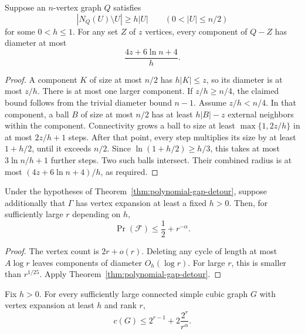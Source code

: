 \begin{lemma}
\label{lem:expander-deletion-diameter}
Suppose an $n$-vertex graph $Q$ satisfies
\[
 |N_Q(U)\setminus U|\ge h|U|
 \qquad(0<|U|\le n/2)
\]
for some $0<h\le1$.
For any set $Z$ of $z$ vertices, every component of $Q-Z$ has diameter at most
\[
 \frac{4z+6\ln n+4}{h}.
\]
\end{lemma}

\begin{proof}
A component $K$ of size at most $n/2$ has $h|K|\le z$, so its diameter is at most $z/h$.
There is at most one larger component.
If $z/h\ge n/4$, the claimed bound follows from the trivial diameter bound $n-1$.
Assume $z/h<n/4$.
In that component, a ball $B$ of size at most $n/2$ has at least $h|B|-z$ external neighbors within the component.
Connectivity grows a ball to size at least $\max\{1,2z/h\}$ in at most $2z/h+1$ steps.
After that point, every step multiplies its size by at least $1+h/2$, until it exceeds $n/2$.
Since $\ln(1+h/2)\ge h/3$, this takes at most $3\ln n/h+1$ further steps.
Two such balls intersect.
Their combined radius is at most $(4z+6\ln n+4)/h$, as required.
\end{proof}

\begin{corollary}
\label{cor:expander-polynomial-forest}
Under the hypotheses of Theorem~\ref{thm:polynomial-gap-detour}, suppose additionally that $\Gamma$ has vertex expansion at least a fixed $h>0$.
Then, for sufficiently large $r$ depending on $h$,
\[
 \Pr(\mathcal F)\le\frac12+r^{-\alpha}.
\]
\end{corollary}

\begin{proof}
The vertex count is $2r+o(r)$.
Deleting any cycle of length at most $A\log r$ leaves components of diameter $O_h(\log r)$.
For large $r$, this is smaller than $r^{1/25}$.
Apply Theorem~\ref{thm:polynomial-gap-detour}.
\end{proof}

\begin{theorem}
\label{thm:expander-polynomial-cycles}
Fix $h>0$.
For every sufficiently large connected simple cubic graph $G$ with vertex expansion at least $h$ and rank $r$,
\[
 c(G)\le2^{r-1}+2\frac{2^r}{r^\alpha}.
\]
\end{theorem}

